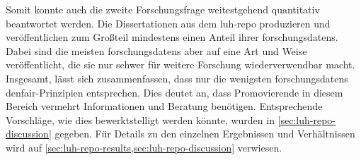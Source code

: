 Somit konnte auch die zweite Forschungsfrage weitestgehend quantitativ beantwortet werden.
Die Dissertationen aus dem \gls{luh-repo} produzieren und veröffentlichen zum Großteil mindestens einen Anteil ihrer \glspl{forschungsdaten}.
Dabei sind die meisten \glspl{forschungsdaten} aber auf eine Art und Weise veröffentlicht, die sie nur schwer für weitere Forschung wiederverwendbar macht.
Insgesamt, lässt sich zusammenfassen, dass nur die wenigsten \glspl{forschungsdaten} den\gls{fair}-Prinzipien entsprechen.
Dies deutet an, dass Promovierende in diesem Bereich vermehrt Informationen und Beratung benötigen.
Entsprechende Vorschläge, wie dies bewerktstelligt werden könnte, wurden in \cref{sec:luh-repo-discussion} gegeben.
Für Details zu den einzelnen Ergebnissen und Verhältnissen wird auf \cref{sec:luh-repo-results,sec:luh-repo-discussion} verwiesen.